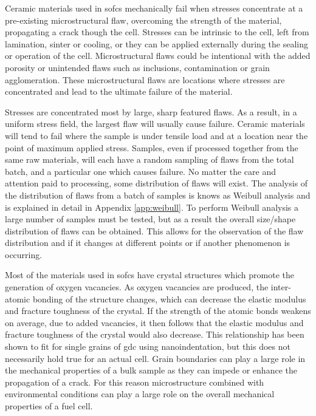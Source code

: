     Ceramic materials used in \glspl{sofc} mechanically fail when stresses concentrate at a pre-existing microstructural flaw, overcoming the strength of the material, propagating a crack though the cell.
    Stresses can be intrinsic to the cell, left from lamination, sinter or cooling, or they can be applied externally during the sealing or operation of the cell.
    Microstructural flaws could be intentional with the added porosity or unintended flaws such as inclusions, contamination or grain agglomeration.
    These microstructural flaws are locations where stresses are concentrated and lead to the ultimate failure of the material.

    Stresses are concentrated most by large, sharp featured flaws.
    As a result, in a uniform stress field, the largest flaw will usually cause failure.
    Ceramic materials will tend to fail where the sample is under tensile load and at a location near the point of maximum applied stress.
    Samples, even if processed together from the same raw materials, will each have a random sampling of flaws from the total batch, and a particular one which causes failure.
    No matter the care and attention paid to processing, some distribution of flaws will exist.
    The analysis of the distribution of flaws from a batch of samples is knows as Weibull analysis and is explained in detail in Appendix \ref{app:weibull}.
    To perform Weibull analysis a large number of samples must be tested, but as a result the overall size/shape distribution of flaws can be obtained.
    This allows for the observation of the flaw distribution and if it changes at different points or if another phenomenon is occurring.

    Most of the materials used in \glspl{sofc} have crystal structures which promote the generation of oxygen vacancies.
    As oxygen vacancies are produced, the inter-atomic bonding of the structure changes, which can decrease the elastic modulus and fracture toughness of the crystal.\cite{Bishop2014,Duncan2006}
    If the strength of the atomic bonds weakens on average, due to added vacancies, it then follows that the elastic modulus and fracture toughness of the crystal would also decrease.
    This relationship has been shown to fit for single grains of \gls{gdc} using nanoindentation, but this does not necessarily hold true for an actual cell.\cite{Wang2007}
    Grain boundaries can play a large role in the mechanical properties of a bulk sample as they can impede or enhance the propagation of a crack.
    For this reason microstructure combined with environmental conditions can play a large role on the overall mechanical properties of a fuel cell.

